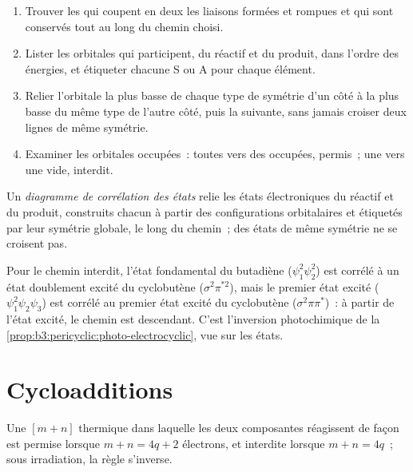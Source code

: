\begin{method}\label{met:b3:pericyclic:correlation-diagram}
\begin{enumerate}
  \item Trouver les  qui coupent en deux les liaisons
        formées et rompues et qui sont conservés tout au long du chemin
        choisi.
  \item Lister les orbitales qui participent, du réactif et du produit,
        dans l'ordre des énergies, et étiqueter chacune S ou A pour chaque
        élément.
  \item Relier l'orbitale la plus basse de chaque type de symétrie d'un
        côté à la plus basse du même type de l'autre côté, puis la suivante,
        sans jamais croiser deux lignes de même symétrie.
  \item Examiner les orbitales occupées~: toutes vers des occupées,
        permis~; une vers une vide, interdit.
\end{enumerate}
\end{method}

\begin{definition}\label{def:b3:pericyclic:state-correlation}
Un \emph{diagramme de corrélation des états} relie les
états électroniques du réactif et du produit, construits chacun à partir
des configurations orbitalaires et étiquetés par leur symétrie globale, le
long du chemin~; des états de même symétrie ne se croisent pas.
\end{definition}

Pour le chemin  interdit, l'état fondamental du butadiène ($\psi_1^2\psi_2^2$)
est corrélé à un état doublement excité du cyclobutène ($\sigma^2\pi^{*2}$), mais le premier état
excité ($\psi_1^2\psi_2\psi_3$) est corrélé au premier état excité du cyclobutène ($\sigma^2\pi\pi^*$)~: à partir de
l'état excité, le chemin  est descendant. C'est l'inversion
photochimique de la \cref{prop:b3:pericyclic:photo-electrocyclic}, vue sur
les états.

\section{Cycloadditions}

\begin{theorem}[Cycloadditions]\label{thm:b3:pericyclic:cycloaddition}
Une  $[m + n]$ thermique dans laquelle les deux composantes réagissent de façon
 est permise lorsque $m + n = 4q + 2$ électrons, et interdite lorsque $m + n = 4q$~; sous irradiation, la
règle s'inverse.
\end{theorem}

